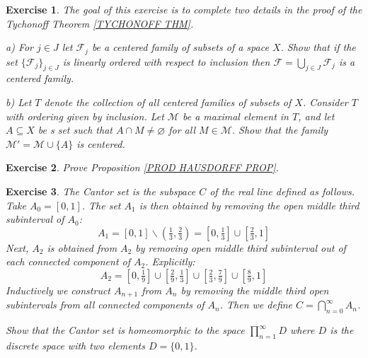 \documentclass[11pt, letterpaper, oneside]{report}
\theoremstyle{pplain}
\newtheorem{ITERMVALUE THM}[theorem]{Intermediate Value Theorem}
\newtheorem{HEINEBOREL THM}[theorem]{Heine-Borel Theorem}
\newtheorem{UMETR THM}[theorem]{Urysohn Metrization Theorem}
\newtheorem{UMETR2 THM}[theorem]{Urysohn Metrization Theorem (v.2)}
\theoremstyle{ddefinition}
\theoremstyle{nnn}
\newtheorem{TDA NN}[theorem]{Topological Data Analysis. }
\theoremstyle{eexercise}
\newtheorem{exercise}{Exercise}[chapter]
\newcommand{\FF}{{\mathcal F}}
\newcommand{\MM}{{\mathcal M}}
\newcommand{\ssmin}{\smallsetminus}
\begin{document}
\begin{exercise}
The goal of this exercise is to complete two details in the proof of the Tychonoff Theorem
\ref{TYCHONOFF THM}. 

a) For $j\in J$ let  $\FF_{j}$ be a centered family of subsets of a space $X$. Show that if 
the set $\{\FF_{j}\}_{j\in J}$ is linearly ordered with respect to inclusion then 
$\FF = \bigcup_{j\in J} \FF_{j}$ is a centered family. 

b)  Let $T$ denote the collection of all centered families of  subsets of $X$. Consider 
$T$ with ordering given by inclusion. Let $\MM$ be a maximal element in $T$,  and 
let $A\subseteq X$ be s set such that $A \cap M\neq \varnothing$ for all $M\in \MM$. 
Show that the family $\MM' = \MM \cup \{A\}$ is centered. 
\end{exercise}





\begin{exercise}
Prove Proposition \ref{PROD HAUSDORFF PROP}.
\end{exercise}





\begin{exercise}
The \emph{Cantor set} is the subspace $C$ of the real line defined as follows. 
Take $A_{0} = [0, 1]$. The set $A_{1}$ is then obtained by removing the  
open middle third  subinterval of $A_{0}$: 
$$A_{1} = [0, 1] \ssmin (\tfrac{1}{3}, \tfrac{2}{3}) = [0, \tfrac{1}{3}] \cup [\tfrac{2}{3}, 1]$$
Next, $A_{2}$ is obtained from $A_{2}$ by removing open middle third subinterval 
out of each connected component of $A_{2}$. Explicitly:
$$A_{2}  = [0, \tfrac{1}{9}] \cup [\tfrac{2}{9}, \tfrac{1}{3}]
\cup [\tfrac{2}{3}, \tfrac{7}{9}] \cup  [\tfrac{8}{9}, 1]$$
Inductively we construct  $A_{n+1}$ from $A_{n}$ by removing the middle third open subintervals 
from all connected components of $A_{n}$. Then we define $C = \bigcap_{n=0}^{\infty} A_{n}$. 

Show that the Cantor set is homeomorphic to the space $\prod_{n=1}^{\infty} D$ where $D$ is the 
discrete space with two elements $D = \{0, 1\}$.
\end{exercise}




\newpage
\end{document}
